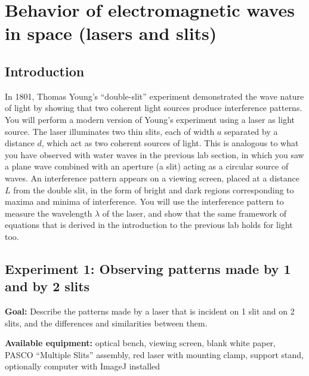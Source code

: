\chapter{Behavior of electromagnetic waves in space (lasers and slits)}


\section{Introduction}

In 1801, Thomas Young's ``double-slit'' experiment demonstrated the wave nature of light by showing that two coherent light sources produce interference patterns. You will perform a modern version of Young's experiment using a
laser as light source. The laser illuminates two thin slits, each of width $a$ separated by a distance $d$, which act as two
coherent sources of light. This is analogous to what you have observed with water waves in the previous lab section, in
which you saw a plane wave combined with an aperture (a slit) acting as a circular source of waves. An interference
pattern appears on a viewing screen, placed at a distance $L$ from the double slit, in the form of bright and dark regions
corresponding to maxima and minima of interference. You will use the interference pattern to measure the wavelength
$\lambda$ of the laser, and show that the same framework of equations that is derived in the introduction to the previous lab
holds for light too.

\section{Experiment 1: Observing patterns made by 1 and by 2 slits}\label{li:sec:exp1}

\textbf{Goal:} Describe the patterns made by a laser that is incident on 1 slit and on 2 slits, and the differences and similarities between them.

\textbf{Available equipment:} optical bench, viewing screen, blank white paper, PASCO ``Multiple Slits'' assembly, red laser with mounting clamp, support stand, optionally computer with ImageJ installed

